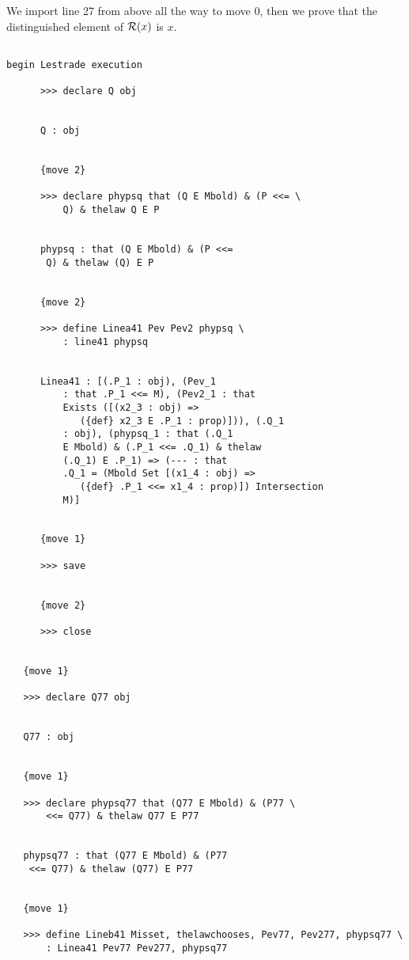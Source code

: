 \documentclass[12pt]{article}
\begin{document}
We import line 27 from above all the way to move 0, then we prove that the distinguished element of ${\cal R}(x)$ is $x$.

\begin{verbatim}

begin Lestrade execution

      >>> declare Q obj


      Q : obj


      {move 2}

      >>> declare phypsq that (Q E Mbold) & (P <<= \
          Q) & thelaw Q E P


      phypsq : that (Q E Mbold) & (P <<= 
       Q) & thelaw (Q) E P


      {move 2}

      >>> define Linea41 Pev Pev2 phypsq \
          : line41 phypsq


      Linea41 : [(.P_1 : obj), (Pev_1 
          : that .P_1 <<= M), (Pev2_1 : that 
          Exists ([(x2_3 : obj) => 
             ({def} x2_3 E .P_1 : prop)])), (.Q_1 
          : obj), (phypsq_1 : that (.Q_1 
          E Mbold) & (.P_1 <<= .Q_1) & thelaw 
          (.Q_1) E .P_1) => (--- : that 
          .Q_1 = (Mbold Set [(x1_4 : obj) => 
             ({def} .P_1 <<= x1_4 : prop)]) Intersection 
          M)]


      {move 1}

      >>> save


      {move 2}

      >>> close


   {move 1}

   >>> declare Q77 obj


   Q77 : obj


   {move 1}

   >>> declare phypsq77 that (Q77 E Mbold) & (P77 \
       <<= Q77) & thelaw Q77 E P77


   phypsq77 : that (Q77 E Mbold) & (P77 
    <<= Q77) & thelaw (Q77) E P77


   {move 1}

   >>> define Lineb41 Misset, thelawchooses, Pev77, Pev277, phypsq77 \
       : Linea41 Pev77 Pev277, phypsq77



\end{verbatim}
\end{document}
